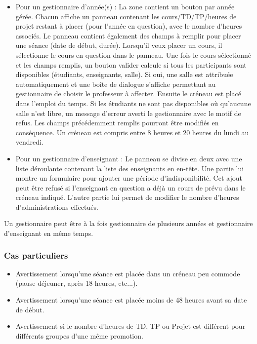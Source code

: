 \documentclass{article}
\begin{document}
\begin{itemize}
\item Pour un gestionnaire d'année(s) :
La zone contient un bouton par année gérée. Chacun affiche un panneau contenant les cours/TD/TP/heures de projet restant à placer (pour l'année en question), avec le nombre d'heures associés. Le panneau contient également des champs à remplir pour placer une séance (date de début, durée). Lorsqu'il veux placer un cours, il sélectionne le cours en question dans le panneau. Une fois le cours sélectionné et les champs remplis, un bouton valider calcule si tous les participants sont disponibles (étudiants, enseignants, salle). Si oui, une salle est attribuée automatiquement et une boîte de dialogue s'affiche permettant au gestionnaire de choisir le professeur à affecter. Ensuite le créneau est placé dans l'emploi du temps. Si les étudiants ne sont pas disponibles où qu'aucune salle n'est libre, un message d'erreur averti le gestionnaire avec le motif de refus. Les champs précédemment remplis pourront être modifiés en conséquence.
Un créneau est compris entre 8 heures et 20 heures du lundi au vendredi.\\

\item Pour un gestionnaire d'enseignant :
Le panneau se divise en deux avec une liste déroulante contenant la liste des enseignants en en-tête.
Une partie lui montre un formulaire pour ajouter une période d'indisponibilité. Cet ajout peut être refusé si l'enseignant en question a déjà un cours de prévu dans le créneau indiqué.
L'autre partie lui permet de modifier le nombre d'heures d'administrations effectués.
\end{itemize}

Un gestionnaire peut être à la fois gestionnaire de plusieurs années et gestionnaire d'enseignant en même temps.

\subsubsection{Cas particuliers}
\begin{itemize}
\item Avertissement lorsqu'une séance est placée dans un créneau peu commode (pause déjeuner, après 18 heures, etc...).
\item Avertissement lorsqu'une séance est placée moins de 48 heures avant sa date de début.
\item Avertissement si le nombre d'heures de TD, TP ou Projet est différent pour différents groupes d'une même promotion.
\end{itemize}
\end{document}
